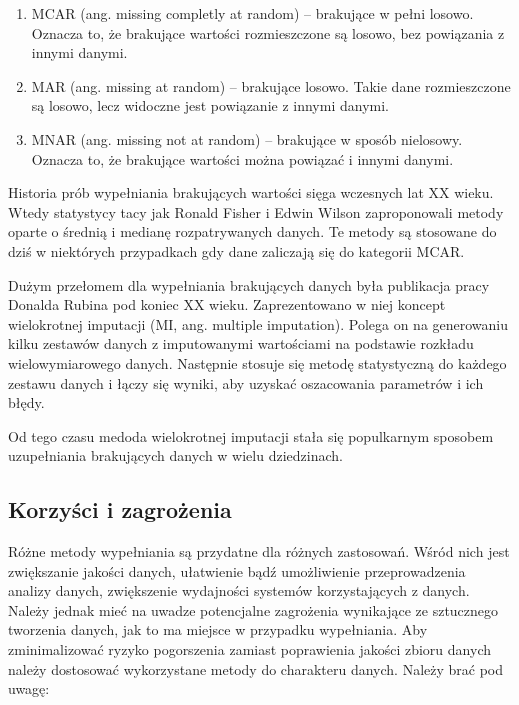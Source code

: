 \documentclass[12pt,twoside]{article}
\begin{document}
\begin{enumerate}[label=\arabic*), leftmargin=1.25cm]
    \item MCAR (ang. missing completly at random) -- brakujące w pełni losowo. Oznacza to,
          że brakujące wartości rozmieszczone są losowo, bez powiązania z innymi danymi.
    \item MAR (ang. missing at random) -- brakujące losowo. Takie dane rozmieszczone są losowo,
          lecz widoczne jest powiązanie z innymi danymi.
    \item MNAR (ang. missing not at random) -- brakujące w sposób nielosowy. Oznacza to,
          że brakujące wartości można powiązać i innymi danymi.
\end{enumerate}

Historia prób wypełniania brakujących wartości sięga wczesnych lat XX wieku.
Wtedy statystycy tacy jak Ronald Fisher i Edwin Wilson zaproponowali metody oparte o średnią i medianę
rozpatrywanych danych. Te metody są stosowane do dziś w niektórych przypadkach gdy dane zaliczają się do kategorii
MCAR. \cite{fisher}\cite{wilson}

Dużym przełomem dla wypełniania brakujących danych była publikacja pracy Donalda Rubina pod koniec XX wieku.
Zaprezentowano w niej koncept wielokrotnej imputacji (MI, ang. multiple imputation).
Polega on na generowaniu kilku zestawów danych z imputowanymi wartościami na podstawie rozkładu
wielowymiarowego danych. Następnie stosuje się metodę statystyczną do każdego zestawu danych i łączy się wyniki,
aby uzyskać oszacowania parametrów i ich błędy. \cite{rubin}

Od tego czasu medoda wielokrotnej imputacji stała się populkarnym sposobem uzupełniania brakujących danych
w wielu dziedzinach. \cite{multi}

\subsection{Korzyści i zagrożenia}

Różne metody wypełniania są przydatne dla różnych zastosowań. Wśród nich jest zwiększanie jakości danych,
ułatwienie bądź umożliwienie przeprowadzenia analizy danych, zwiększenie wydajności systemów korzystających z danych.
Należy jednak mieć na uwadze potencjalne zagrożenia wynikające ze sztucznego tworzenia danych,
jak to ma miejsce w przypadku wypełniania.
Aby zminimalizować ryzyko pogorszenia zamiast poprawienia jakości zbioru danych należy dostosować wykorzystane metody
do charakteru danych. Należy brać pod uwagę:
\end{document}
